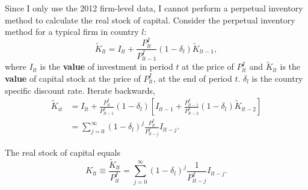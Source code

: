 \documentclass[notitlepage,11pt]{article}%
\begin{document}
Since I only use the 2012 firm-level data, I cannot perform a perpetual
inventory method to calculate the real stock of capital. Consider the
perpetual inventory method for a typical firm in country $l$:%
\[
\tilde{K}_{lt}=I_{lt}+\frac{P_{lt}^{I}}{P_{lt-1}^{I}}\left(  1-\delta
_{l}\right)  \tilde{K}_{lt-1},
\]
where $I_{lt}$ is the \textbf{value} of investment in period $t$ at the price
of $P_{lt}^{I}$ and $\tilde{K}_{lt}$ is the \textbf{value} of capital stock at
the price of $P_{lt}^{I}$, at the end of period $t$. $\delta_{l}$ is the
country specific discount rate. Iterate backwards,%
\begin{align*}
\tilde{K}_{it}  &  =I_{lt}+\frac{P_{lt}^{I}}{P_{lt-1}^{I}}\left(  1-\delta
_{l}\right)  \left[  I_{lt-1}+\frac{P_{lt-1}^{I}}{P_{lt-2}^{I}}\left(
1-\delta_{l}\right)  \tilde{K}_{lt-2}\right] \\
&  =\sum_{j=0}^{\infty}\left(  1-\delta_{l}\right)  ^{j}\frac{P_{lt}^{I}%
}{P_{lt-j}^{I}}I_{lt-j}.
\end{align*}


The real stock of capital equals%
\[
K_{lt}\equiv\frac{\tilde{K}_{lt}}{P_{lt}^{I}}=\sum_{j=0}^{\infty}\left(
1-\delta_{l}\right)  ^{j}\frac{1}{P_{lt-j}^{I}}I_{lt-j}.
\]
\end{document}
